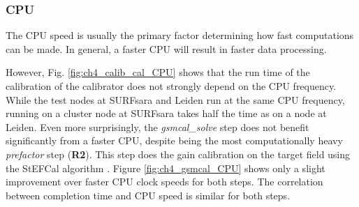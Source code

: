 \subsubsection{CPU}
The CPU speed is usually the primary factor determining how fast computations can be made. In general, a faster CPU will result in faster data processing. 

However, Fig. \ref{fig:ch4_calib_cal_CPU} shows that the run time of the calibration of the calibrator does not strongly depend on the CPU frequency. While the test nodes at SURFsara and Leiden run at the same CPU frequency, running on a cluster node at SURFsara takes half the time as on a node at Leiden. Even more surprisingly, the \textit{gsmcal\_solve} step does not benefit significantly from a faster CPU, despite being the most computationally heavy \textit{prefactor} step (\textbf{R2}). This step does the gain calibration on the target field using the StEFCal algorithm \citep{stefcal}. Figure \ref{fig:ch4_gsmcal_CPU} shows only a slight improvement over faster CPU clock speeds for both steps. The correlation between completion time and CPU speed is similar for both steps.

